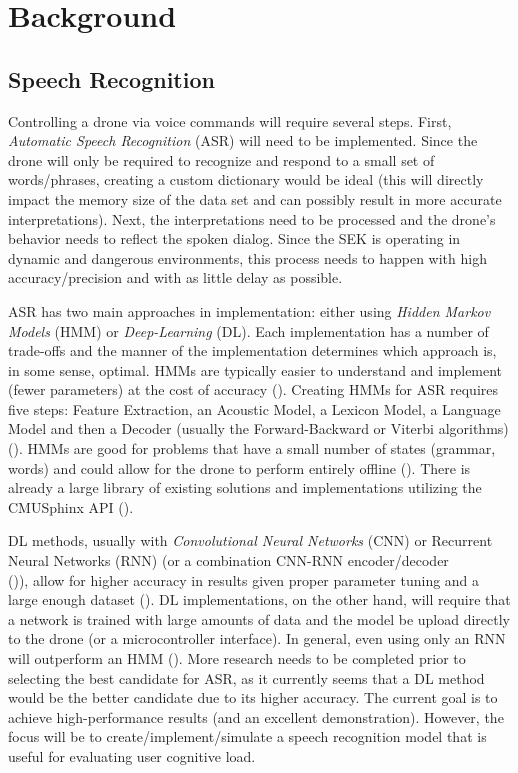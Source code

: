 \chapter{Background}
\label{background}


\section{Speech Recognition}
Controlling a drone via voice commands will require several steps. First, \textit{Automatic Speech Recognition} (ASR) will need to be implemented. Since the drone will only be required to recognize and respond to a small set of words/phrases, creating a custom dictionary would be ideal (this will directly impact the memory size of the data set and can possibly result in more accurate interpretations). Next, the interpretations need to be processed and the drone's behavior needs to reflect the spoken dialog. Since the SEK is operating in dynamic and dangerous environments, this process needs to happen with high accuracy/precision and with as little delay as possible. 
\bigskip

ASR has two main approaches in implementation: either using \textit{Hidden Markov Models} (HMM) or \textit{Deep-Learning} (DL). Each implementation has a number of trade-offs and the manner of the implementation determines which approach is, in some sense, optimal. HMMs are typically easier to understand and implement (fewer parameters) at the cost of accuracy (\cite{Multimodal}). Creating HMMs for ASR requires five steps: Feature Extraction, an Acoustic Model, a Lexicon Model, a Language Model and then a Decoder (usually the Forward-Backward or Viterbi algorithms) (\cite{Stanford}). HMMs are good for problems that have a small number of states (grammar, words) and could allow for the drone to perform entirely offline (\cite{CMU1}). There is already a large library of existing solutions and implementations utilizing the CMUSphinx API (\cite{CMU-Sphinx}).
\smallskip

DL methods, usually with \textit{Convolutional Neural Networks} (CNN) or Recurrent Neural Networks (RNN) (or a combination CNN-RNN encoder/decoder \\ (\cite{Wang2016CNNRNNAU})), allow for higher accuracy in results given proper parameter tuning and a large enough dataset  (\cite{Song2015EndtoEndDN}).  DL implementations, on the other hand, will require that a network is trained with large amounts of data and the model be upload directly to the drone (or a microcontroller interface). In general, even using only an RNN will outperform an HMM (\cite{Connectionist}). More research needs to be completed prior to selecting the best candidate for ASR, as it currently seems that a DL method would be the better candidate due to its higher accuracy. The current goal is to achieve high-performance results (and an excellent demonstration). However, the focus will be to create/implement/simulate a speech recognition model that is useful for evaluating user cognitive load.
\smallskip

